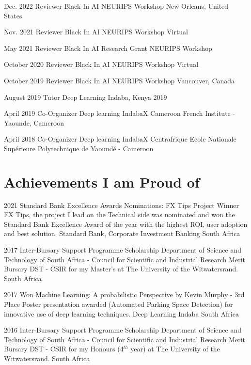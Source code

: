 \documentclass[11pt, letterpaper]{moderncv}        %
\begin{document}
\cventry
{Dec. 2022}
{Reviewer Black In AI}
{NEURIPS Workshop}
{New Orleans, United States}
{}
{}

\cventry
{Nov. 2021}
{Reviewer Black In AI}
{NEURIPS Workshop}
{Virtual}
{}
{}

\cventry
{May 2021}
{Reviewer Black In AI Research Grant}
{NEURIPS Workshop}
{}
{}
{}

\cventry
{October 2020}
{Reviewer Black In AI}
{NEURIPS Workshop}
{Virtual}
{}
{}

\cventry
{October 2019}
{Reviewer Black In AI}
{NEURIPS Workshop}
{Vancouver, Canada}
{}
{}

\cventry
{August 2019}
{Tutor}
{Deep Learning Indaba, Kenya 2019}
{}
{}
{}

\cventry
{April 2019}
{Co-Organizer Deep learning IndabaX Cameroon}
{French Institute - Yaounde, Cameroon}
{}
{}
{}


\cventry
{April 2018}
{Co-Organizer Deep learning IndabaX Centrafrique}
{Ecole Nationale Supérieure Polytechnique de Yaoundé - Cameroon}
{}
{}
{}


\section{Achievements I am Proud of}

\cventry
{2021}
{Standard Bank Excellence Awards Nominations: FX Tips Project Winner}
{FX Tips, the project I lead on the Technical side was nominated and won the Standard Bank Excellence Award of the year with the highest ROI, user adoption and best solution.}
{Standard Bank, Corporate Investment Banking}
{South Africa}
{}

\cventry
{2017}
{Inter-Bursary Support Programme Scholarship}
{Department of Science and Technology of South Africa - Council for Scientific and Industrial Research Merit Bursary}
{DST - CSIR for my Master's at The University of the Witwatersrand.}
{South Africa}
{}

\cventry
{2017}
{Won Machine Learning: A probabilistic Perspective by Kevin Murphy - 3rd Place}
{Poster presentation awarded (Automated Parking Space Detection) for innovative use of deep learning techniques.}
{Deep Learning Indaba}
{South Africa}
{}

\cventry
{2016}
{Inter-Bursary Support Programme Scholarship}
{Department of Science and Technology of South Africa - Council for Scientific and Industrial Research Merit Bursary}
{DST - CSIR for my Honours (4$^{th}$ year) at The University of the Witwatersrand.}
{South Africa}
{}
\end{document}
